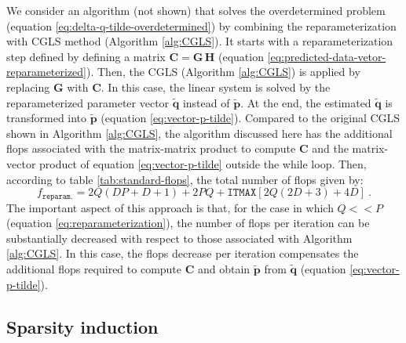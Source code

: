 We consider an algorithm (not shown) that solves the overdetermined problem (equation \ref{eq:delta-q-tilde-overdetermined}) by
combining the reparameterization with CGLS method (Algorithm \ref{alg:CGLS}).
It starts with a reparameterization step defined by defining a matrix $\mathbf{C} = \mathbf{G \, H}$ 
(equation \ref{eq:predicted-data-vetor-reparameterized}).
Then, the CGLS (Algorithm \ref{alg:CGLS}) is applied by replacing $\mathbf{G}$ with $\mathbf{C}$.
In this case, the linear system is solved by the reparameterized parameter vector $\tilde{\mathbf{q}}$ instead of
$\tilde{\mathbf{p}}$. At the end, the estimated $\tilde{\mathbf{q}}$ is transformed into $\tilde{\mathbf{p}}$ 
(equation \ref{eq:vector-p-tilde}).
Compared to the original CGLS shown in Algorithm \ref{alg:CGLS}, the algorithm discussed here has the additional flops
associated with the matrix-matrix product to compute $\mathbf{C}$ and the matrix-vector product of equation \ref{eq:vector-p-tilde} outside the while loop.
Then, according to table \ref{tab:standard-flops}, the total number of flops given by:
\begin{equation}
	f_{\mathtt{reparam.}} = 2Q(DP+D+1) + 2PQ + \mathtt{ITMAX} \left[ 2Q \left( 2D + 3 \right) + 4D \right] \: .
	\label{flops:reparameterization-cgls}
\end{equation}
The important aspect of this approach is that, for the case in which $Q << P$ (equation \ref{eq:reparameterization}),
the number of flops per iteration can be substantially decreased with respect to those associated with Algorithm \ref{alg:CGLS}.
In this case, the flops decrease per iteration compensates the additional flops required to compute $\mathbf{C}$ and 
obtain $\tilde{\mathbf{p}}$ from $\tilde{\mathbf{q}}$ (equation \ref{eq:vector-p-tilde}).

\subsection{Sparsity induction}

